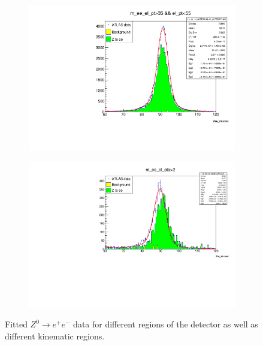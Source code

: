 \begin{figure}
\begin{subfigure}{0.5\textwidth}
            \includegraphics[width=\textwidth]{../W_mass/Z_mass_check_el_pt-cut-critical.pdf}
        \end{subfigure}
        \begin{subfigure}{0.5\textwidth}
            \includegraphics[width=\textwidth]{../W_mass/Z_mass_check_eta_large.pdf}
        \end{subfigure}
        \caption{Fitted $Z^0 \rightarrow e^+e^-$ data for different regions of the detector as well as different kinematic regions.}
        \label{fig:z-mass_check1}
    \end{figure}
